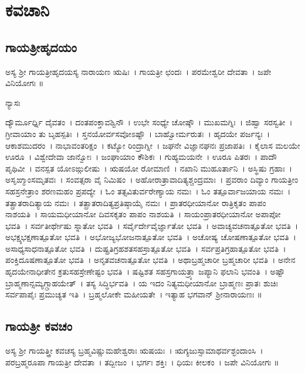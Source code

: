 \setcounter{page}{0}
\thispagestyle{empty}
\chapter*{\center ಕವಚಾನಿ}
\section{ಗಾಯತ್ರೀಹೃದಯಂ }
\thispagestyle{empty}
ಅಸ್ಯ ಶ್ರೀ ಗಾಯತ್ರೀಹೃದಯಸ್ಯ ನಾರಾಯಣ ಋಷಿಃ~। ಗಾಯತ್ರೀ ಛಂದಃ~। ಪರಮೇಶ್ವರೀ ದೇವತಾ~। ಜಪೇ ವಿನಿಯೋಗಃ ॥
\begin{center}ನ್ಯಾಸಃ\end{center}
ದ್ಯೌರ್ಮೂರ್ಧ್ನಿ ದೈವತಂ~। ದಂತಪಂಕ್ತಾವಶ್ವಿನೌ~। ಉಭೇ ಸಂಧ್ಯೇ ಚೋಷ್ಠೌ~। ಮುಖಮಗ್ನಿಃ~। ಜಿಹ್ವಾ ಸರಸ್ವತೀ~। ಗ್ರೀವಾಯಾಂ ತು ಬೃಹಸ್ಪತಿಃ~। ಸ್ತನಯೋರ್ವಸವೋಽಷ್ಟೌ~। ಬಾಹ್ವೋರ್ಮರುತಃ~। ಹೃದಯೇ ಪರ್ಜನ್ಯಃ~। ಆಕಾಶಮುದರಂ~। ನಾಭಾವಂತರಿಕ್ಷಂ~। ಕಟ್ಯೋ ರಿಂದ್ರಾಗ್ನೀ~। ಜಘನೇ ವಿಜ್ಞಾನಘನಃ ಪ್ರಜಾಪತಿಃ~। ಕೈಲಾಸ ಮಲಯೇ ಊರೂ~। ವಿಶ್ವೇದೇವಾ ಜಾನ್ವೋಃ~। ಜಂಘಾಯಾಂ ಕೌಶಿಕಃ~। ಗುಹ್ಯಮಯನೇ~। ಊರೂ ಪಿತರಃ~। ಪಾದೌ ಪೃಥಿವೀ~। ವನಸ್ಪತ ಯೋಽಙ್ಗುಲೀಷು~। ಋಷಯೋ ರೋಮಾಣಿ~। ನಖಾನಿ ಮುಹೂರ್ತಾನಿ~। ಅಸ್ಥಿಷು ಗ್ರಹಾಃ~। ಅಸೃಙ್ಮಾಂಸಮೃತವಃ~। ಸಂವತ್ಸರಾ ವೈ ನಿಮಿಷಂ~। ಅಹೋರಾತ್ರಾವಾದಿತ್ಯಶ್ಚಂದ್ರಮಾಃ~। ಪ್ರವರಾಂ ದಿವ್ಯಾಂ ಗಾಯತ್ರೀಂ ಸಹಸ್ರನೇತ್ರಾಂ ಶರಣಮಹಂ ಪ್ರಪದ್ಯೇ~। ಓಂ ತತ್ಸವಿತುರ್ವರೇಣ್ಯಾಯ ನಮಃ~। ಓಂ ತತ್ಪೂರ್ವಾಜಯಾಯ ನಮಃ~। ತತ್ಪ್ರಾತರಾದಿತ್ಯಾಯ ನಮಃ~। ತತ್ಪ್ರಾತರಾದಿತ್ಯಪ್ರತಿಷ್ಠಾಯೈ ನಮಃ~। ಪ್ರಾತರಧೀಯಾನೋ ರಾತ್ರಿಕೃತಂ ಪಾಪಂ ನಾಶಯತಿ~। ಸಾಯಮಧೀಯಾನೋ ದಿವಸಕೃತಂ ಪಾಪಂ ನಾಶಯತಿ~। ಸಾಯಂಪ್ರಾತರಧೀಯಾನೋ ಅಪಾಪೋ ಭವತಿ~। ಸರ್ವತೀರ್ಥೇಷು ಸ್ನಾತೋ ಭವತಿ~। ಸರ್ವೈರ್ದೇವೈರ್ಜ್ಞಾತೋ ಭವತಿ~। ಅವಾಚ್ಯವಚನಾತ್ಪೂತೋ ಭವತಿ~। ಅಭಕ್ಷ್ಯಭಕ್ಷಣಾತ್ಪೂತೋ ಭವತಿ~। ಅಭೋಜ್ಯಭೋಜನಾತ್ಪೂತೋ ಭವತಿ~। ಅಚೋಷ್ಯ ಚೋಷಣಾತ್ಪೂತೋ ಭವತಿ~। ಅಸಾಧ್ಯಸಾಧನಾತ್ಪೂತೋ ಭವತಿ~। ದುಷ್ಪ್ರತಿಗ್ರಹಶತಸಹಸ್ರಾತ್ಪೂತೋ ಭವತಿ~। ಸರ್ವಪ್ರತಿಗ್ರಹಾತ್ಪೂತೋ ಭವತಿ~। ಪಂಕ್ತಿದೂಷಣಾತ್ಪೂತೋ ಭವತಿ~। ಅನೃತವಚನಾತ್ಪೂತೋ ಭವತಿ~। ಅಥಾಬ್ರಹ್ಮಚಾರೀ ಬ್ರಹ್ಮಚಾರೀ ಭವತಿ~। ಅನೇನ ಹೃದಯೇನಾಧೀತೇನ ಕ್ರತುಸಹಸ್ರೇಣೇಷ್ಟಂ ಭವತಿ~। ಷಷ್ಟಿಶತ ಸಹಸ್ರಗಾಯತ್ರ್ಯಾ ಜಪ್ಯಾನಿ ಫಲಾನಿ ಭವಂತಿ~। ಅಷ್ಟೌ ಬ್ರಾಹ್ಮಣಾನ್ಸಮ್ಯಗ್ಗ್ರಾಹಯೇತ್~। ತಸ್ಯ ಸಿದ್ಧಿರ್ಭವತಿ~। ಯ ಇದಂ ನಿತ್ಯಮಧೀಯಾನೋ ಬ್ರಾಹ್ಮಣಃ ಪ್ರಾತಃ ಶುಚಿಃ ಸರ್ವಪಾಪೈಃ ಪ್ರಮುಚ್ಯತ ಇತಿ~। ಬ್ರಹ್ಮಲೋಕೇ ಮಹೀಯತೇ~। ಇತ್ಯಾಹ ಭಗವಾನ್ ಶ್ರೀನಾರಾಯಣಃ ॥
\section{ಗಾಯತ್ರೀ ಕವಚಂ}
ಅಸ್ಯ ಶ್ರೀ ಗಾಯತ್ತ್ರೀ ಕವಚಸ್ಯ ಬ್ರಹ್ಮವಿಷ್ಣುಮಹೇಶ್ವರಾಃ ಋಷಯಃ~। ಋಗ್ಯಜುಸ್ಸಾಮಾಥರ್ವಶ್ಛಂದಾಂಸಿ~। ಪರಬ್ರಹ್ಮರೂಪಾ ಗಾಯತ್ರೀ ದೇವತಾ~। ತದ್ಬೀಜಂ~। ಭರ್ಗಃ ಶಕ್ತಿಃ~। ಧಿಯಃ ಕೀಲಕಂ~। ಜಪೇ ವಿನಿಯೋಗಃ ॥
\newpage
{}

